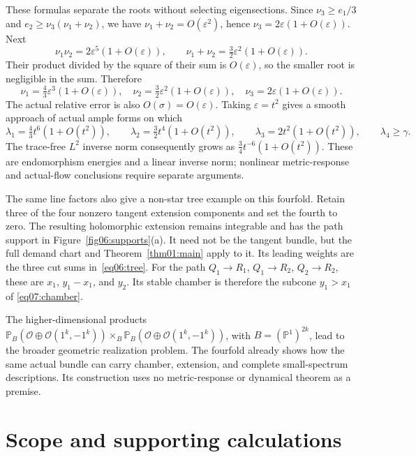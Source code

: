 \documentclass[11pt]{amsart}
\theoremstyle{definition}
\theoremstyle{remark}
\newcommand{\PP}{\mathbb P}
\begin{document}
These formulas separate the roots without selecting
eigensections. Since \(\nu_3\geq e_1/3\) and
\(e_2\geq\nu_3(\nu_1+\nu_2)\), we have
\(\nu_1+\nu_2=O(\varepsilon^2)\), hence
\(\nu_3=2\varepsilon(1+O(\varepsilon))\).
Next
\[
 \nu_1\nu_2=2\varepsilon^5(1+O(\varepsilon)),\qquad
 \nu_1+\nu_2=\tfrac32\varepsilon^2(1+O(\varepsilon)).
\]
Their product divided by the square of their sum is
\(O(\varepsilon)\), so the smaller root is negligible in the
sum. Therefore
\[
 \nu_1=\tfrac43\varepsilon^3(1+O(\varepsilon)),\quad
 \nu_2=\tfrac32\varepsilon^2(1+O(\varepsilon)),\quad
 \nu_3=2\varepsilon(1+O(\varepsilon)).
\]
The actual relative error is also \(O(\sigma)=O(\varepsilon)\).
Taking \(\varepsilon=t^2\) gives a smooth approach of actual
ample forms on which
\begin{equation}\label{eq07:actualthreeorders}
 \lambda_1=\tfrac43t^6(1+O(t^2)),\qquad
 \lambda_2=\tfrac32t^4(1+O(t^2)),\qquad
 \lambda_3=2t^2(1+O(t^2)),\qquad
 \lambda_4\geq\gamma.
\end{equation}
The trace-free \(L^2\) inverse norm consequently grows as
\(\frac34t^{-6}(1+O(t^2))\).
These are endomorphism energies and a linear inverse norm;
nonlinear metric-response and actual-flow conclusions
require separate arguments.

The same line factors also give a non-star tree example on
this fourfold. Retain three of the four nonzero tangent
extension components and set the fourth to zero.
The resulting holomorphic extension remains integrable and has
the path support in Figure~\ref{fig06:supports}(a).
It need not be the tangent bundle, but the full demand chart
and Theorem~\ref{thm01:main} apply to it. Its leading weights
are the three cut sums in~\eqref{eq06:tree}. For the path
\(Q_1\to R_1\), \(Q_1\to R_2\), \(Q_2\to R_2\), these
are \(x_1\), \(y_1-x_1\), and \(y_2\). Its stable chamber is
therefore the subcone \(y_1>x_1\) of \eqref{eq07:chamber}.

The higher-dimensional products
\(\PP_B(\mathcal O\oplus\mathcal O(1^k,-1^k))
\times_B\PP_B(\mathcal O\oplus\mathcal O(1^k,-1^k))\),
with \(B=(\PP^1)^{2k}\), lead to the broader geometric
realization problem. The fourfold already shows how the
same actual bundle can carry chamber, extension, and complete
small-spectrum descriptions. Its construction uses no
metric-response or dynamical theorem as a premise.

\section{Scope and supporting calculations}\label{sec08:scope}
\end{document}

